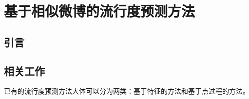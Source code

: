 \chapter{基于相似微博的流行度预测方法}
\label{chap:three}
\section{引言}




\section{相关工作}
已有的流行度预测方法大体可以分为两类：基于特征的方法和基于点过程的方法。

